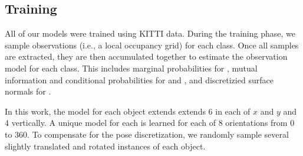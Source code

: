 \subsection{Training} \label{sec:training}

All of our models were trained using KITTI data. During the training phase, we
sample observations (i.e., a local occupancy grid) for each class. Once all samples are
extracted, they are then accumulated together to estimate the observation model
for each class. This includes marginal probabilities for
, mutual information and conditional probabilities for
 and , and discretizied surface normals
for .

In this work, the model for each object extends extends \unit{6}{\m} in each of $x$ and $y$
and \unit{4}{\m} vertically. A unique model for each is learned for each of 8
orientations from \unit{0} to \unit{360}{\deg}. To compensate for the pose
discretization, we randomly sample several slightly translated and rotated
instances of each object.
